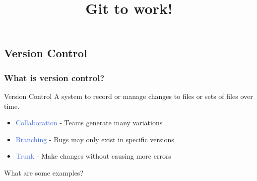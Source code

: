 \documentclass[11pt,professionalfonts]{beamer}
\title[Version Control]{\large\bf  Git to work!}
\author{\vspace*{-0.3cm}}
\institute{
	\footnotesize
	{\normalsize\bf{Shankar Kulumani}}\\
	\vspace*{0.2cm}
  	\bf{Department of Mechanical \& Aerospace Engineering}\\ \vspace*{0.5cm}
 	\begin{figure} %
       	\texttt{[image: gw\_txh\_2cs\_pos]}
  	\end{figure}
}
\date{}
\def\Emph{\textcolor{RoyalBlue}}
\begin{document}

\setcounter{framenumber}{-1}
\begin{frame} %
  \titlepage
\end{frame}   %

\section*{}
\subsection*{Version Control}  

\begin{frame} %
\frametitle{What is version control?} %

\begin{block}{Version Control}
    A system to record or manage changes to files or sets of files over time.
\end{block}

\pause

\begin{itemize}
    \item<1-> \Emph{Collaboration} - Teams generate many variations 
    \item<2-> \Emph{Branching} - Bugs may only exist in specific versions
    \item<3-> \Emph{Trunk} - Make changes without causing more errors
\end{itemize}{}

\end{frame}   %


\begin{frame}{What are some examples?}%


\end{frame}%
\end{document}
